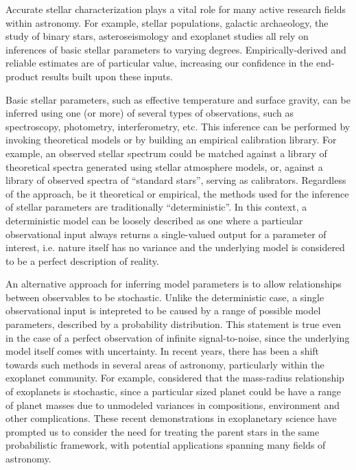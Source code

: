 
Accurate stellar characterization plays a vital role for many active research
fields within astronomy. For example, stellar populations, galactic
archaeology, the study of binary stars, asteroseismology and exoplanet studies
all rely on inferences of basic stellar parameters to varying degrees.
Empirically-derived and reliable estimates are of particular value, increasing
our confidence in the end-product results built upon these inputs.

Basic stellar parameters, such as effective temperature and surface gravity,
can be inferred using one (or more) of several types of observations, such as
spectroscopy, photometry, interferometry, etc. This inference can be performed
by invoking theoretical models or by building an empirical calibration
library.
For example, an observed stellar spectrum could be matched against a library of
theoretical spectra generated using stellar atmosphere models, or, against a
library of observed spectra of ``standard stars'', serving as calibrators.
Regardless of the approach, be it theoretical or empirical, the methods used
for the inference of stellar parameters are traditionally ``deterministic''.
In this context, a deterministic model can be loosely described as one where
a particular observational input always returns a single-valued output for a
parameter of interest, i.e. nature itself has no variance and the underlying
model is considered to be a perfect description of reality.

An alternative approach for inferring model parameters is to allow
relationships between observables to be stochastic.
Unlike the deterministic case, a single observational input is intepreted to
be caused by a range of possible model parameters, described by a probability
distribution.
This statement is true even in the case of a perfect observation of infinite
signal-to-noise, since the underlying model itself comes with uncertainty.
In recent years, there has been a shift towards such methods in several areas
of astronomy, particularly within the exoplanet community.
For example, \citet{wolfgang:2015} considered that the mass-radius
relationship of exoplanets is stochastic, since a particular sized planet
could be have a range of planet masses due to unmodeled variances in
compositions, environment and other complications.
These recent demonstrations in exoplanetary science have prompted us to
consider the need for treating the parent stars in the same probabilistic
framework, with potential applications spanning many fields of astronomy.

